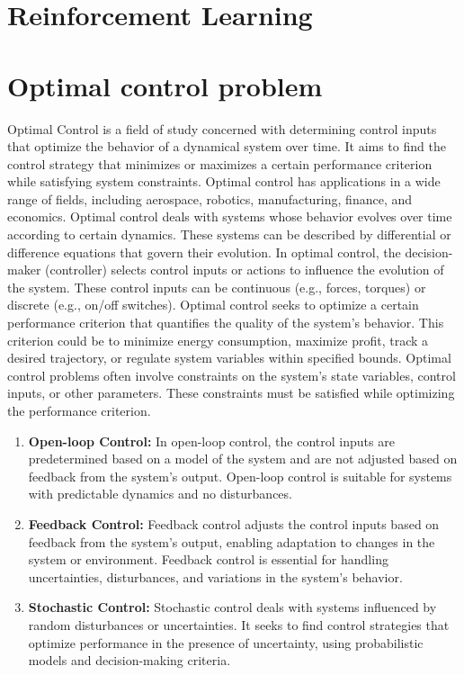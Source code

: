 \documentclass[letterpaper, 10 pt, conference]{ieeeconf}  %
\begin{document}
	\section{Reinforcement Learning}
	
	\section{Optimal control problem}
	Optimal Control is a field of study concerned with determining control inputs that optimize the behavior of a dynamical system over time. It aims to find the control strategy that minimizes or maximizes a certain performance criterion while satisfying system constraints. Optimal control has applications in a wide range of fields, including aerospace, robotics, manufacturing, finance, and economics. Optimal control deals with systems whose behavior evolves over time according to certain dynamics. These systems can be described by differential or difference equations that govern their evolution. In optimal control, the decision-maker (controller) selects control inputs or actions to influence the evolution of the system. These control inputs can be continuous (e.g., forces, torques) or discrete (e.g., on/off switches). Optimal control seeks to optimize a certain performance criterion that quantifies the quality of the system's behavior. This criterion could be to minimize energy consumption, maximize profit, track a desired trajectory, or regulate system variables within specified bounds.  Optimal control problems often involve constraints on the system's state variables, control inputs, or other parameters. These constraints must be satisfied while optimizing the performance criterion.
	\begin{enumerate}
		\item \textbf{Open-loop Control:} In open-loop control, the control inputs are predetermined based on a model of the system and are not adjusted based on feedback from the system's output. Open-loop control is suitable for systems with predictable dynamics and no disturbances.
		
		\item \textbf{Feedback Control:} Feedback control adjusts the control inputs based on feedback from the system's output, enabling adaptation to changes in the system or environment. Feedback control is essential for handling uncertainties, disturbances, and variations in the system's behavior.
		
		\item \textbf{Stochastic Control:} Stochastic control deals with systems influenced by random disturbances or uncertainties. It seeks to find control strategies that optimize performance in the presence of uncertainty, using probabilistic models and decision-making criteria.
	\end{enumerate}
\end{document}
